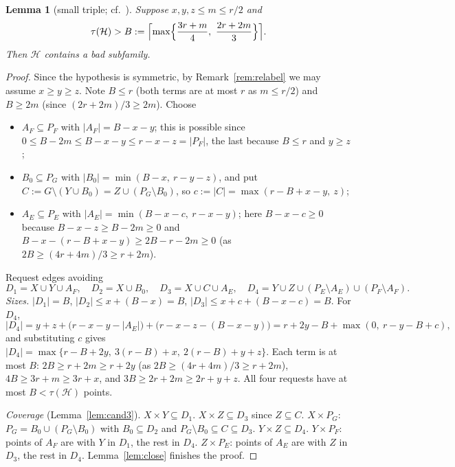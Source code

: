 \documentclass[11pt]{amsart}
\newtheorem{lemma}[theorem]{Lemma}
\theoremstyle{definition}
\theoremstyle{remark}
\newcommand{\cH}{\mathcal H}
\begin{document}
\begin{lemma}[small triple; cf.\ {\cite[Lemma~1, Case~2]{FKW}}]\label{lem:L18}
Suppose $x,y,z\le m\le r/2$ and
\[
\tau(\cH)>B:=\Bigl\lceil\max\Bigl\{\frac{3r+m}{4},\ \frac{2r+2m}{3}\Bigr\}\Bigr\rceil .
\]
Then $\cH$ contains a bad subfamily.
\end{lemma}
\begin{proof}
Since the hypothesis is symmetric, by Remark~\ref{rem:relabel} we may assume $x\ge y\ge z$. Note $B\le r$ (both terms are at most $r$ as $m\le r/2$) and $B\ge 2m$ (since $(2r+2m)/3\ge2m$). Choose
\begin{itemize}
\item $A_F\subseteq P_F$ with $|A_F|=B-x-y$; this is possible since $0\le B-2m\le B-x-y\le r-x-z=|P_F|$, the last because $B\le r$ and $y\ge z$;
\item $B_0\subseteq P_G$ with $|B_0|=\min(B-x,\ r-y-z)$, and put $C:=G\setminus(Y\cup B_0)=Z\cup(P_G\setminus B_0)$, so $c:=|C|=\max(r-B+x-y,\ z)$;
\item $A_E\subseteq P_E$ with $|A_E|=\min(B-x-c,\ r-x-y)$; here $B-x-c\ge0$ because $B-x-z\ge B-2m\ge0$ and $B-x-(r-B+x-y)\ge 2B-r-2m\ge0$ (as $2B\ge(4r+4m)/3\ge r+2m$).
\end{itemize}
Request edges avoiding
\[
D_1=X\cup Y\cup A_F,\quad D_2=X\cup B_0,\quad D_3=X\cup C\cup A_E,\quad D_4=Y\cup Z\cup(P_E\setminus A_E)\cup(P_F\setminus A_F).
\]
\emph{Sizes.} $|D_1|=B$, $|D_2|\le x+(B-x)=B$, $|D_3|\le x+c+(B-x-c)=B$. For $D_4$,
\[
|D_4|=y+z+\bigl(r-x-y-|A_E|\bigr)+\bigl(r-x-z-(B-x-y)\bigr)=r+2y-B+\max(0,\ r-y-B+c),
\]
and substituting $c$ gives $|D_4|=\max\{r-B+2y,\ 3(r-B)+x,\ 2(r-B)+y+z\}$. Each term is at most $B$: $2B\ge r+2m\ge r+2y$ (as $2B\ge(4r+4m)/3\ge r+2m$), $4B\ge3r+m\ge3r+x$, and $3B\ge2r+2m\ge2r+y+z$. All four requests have at most $B<\tau(\cH)$ points.

\emph{Coverage} (Lemma~\ref{lem:cand3}). $X\times Y\subseteq D_1$. $X\times Z\subseteq D_3$ since $Z\subseteq C$. $X\times P_G$: $P_G=B_0\cup(P_G\setminus B_0)$ with $B_0\subseteq D_2$ and $P_G\setminus B_0\subseteq C\subseteq D_3$. $Y\times Z\subseteq D_4$. $Y\times P_F$: points of $A_F$ are with $Y$ in $D_1$, the rest in $D_4$. $Z\times P_E$: points of $A_E$ are with $Z$ in $D_3$, the rest in $D_4$. Lemma~\ref{lem:close} finishes the proof.
\end{proof}
\end{document}

